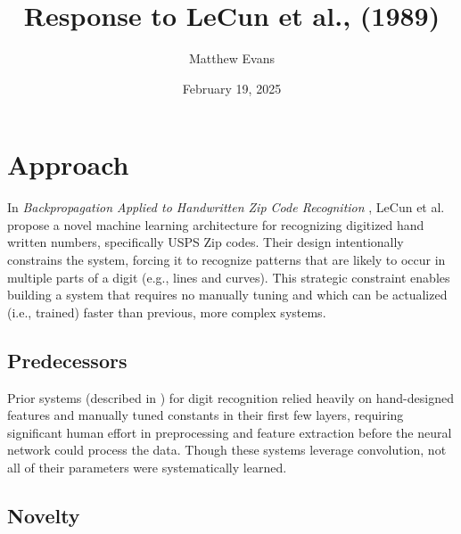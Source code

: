 \documentclass[10pt]{article}
\title{
    Response to LeCun et al., (1989) \\
}
\author{Matthew Evans}
\date{February 19, 2025}
\begin{document}
\maketitle

\section*{Approach}
In \textit{Backpropagation Applied to Handwritten Zip Code Recognition} \cite{lecun1998gradient}, LeCun et al. propose a novel machine learning architecture for recognizing digitized hand written numbers, specifically USPS Zip codes. Their design intentionally constrains the system, forcing it to recognize patterns that are likely to occur in multiple parts of a digit (e.g., lines and curves). This strategic constraint enables building a system that requires no manually tuning and which can be actualized (i.e., trained) faster than previous, more complex systems.

\subsection*{Predecessors}

Prior systems (described in \cite{Denker1989}) for digit recognition relied heavily on hand-designed features and manually tuned constants in their first few layers, requiring significant human effort in preprocessing and feature extraction before the neural network could process the data. Though these systems leverage convolution, not all of their parameters were systematically learned.





\subsection*{Novelty}
\end{document}
